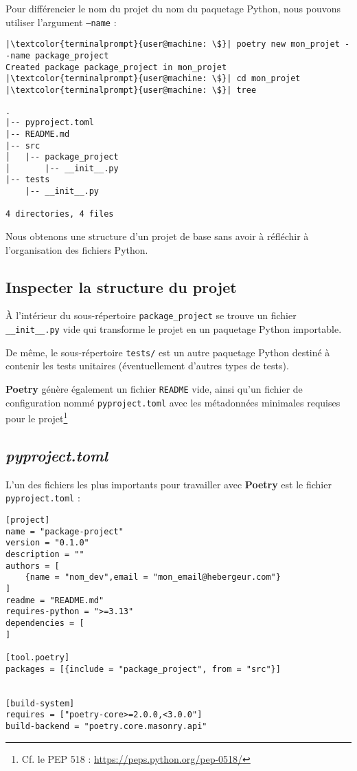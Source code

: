 Pour différencier le nom du projet du nom du paquetage Python, nous pouvons utiliser l'argument \texttt{--name} :
\begin{lstlisting}[style=terminal]
|\textcolor{terminalprompt}{user@machine: \$}| poetry new mon_projet --name package_project
Created package package_project in mon_projet
|\textcolor{terminalprompt}{user@machine: \$}| cd mon_projet
|\textcolor{terminalprompt}{user@machine: \$}| tree
\end{lstlisting}
\begin{verbatim}
.
|-- pyproject.toml
|-- README.md
|-- src
│   |-- package_project
│       |-- __init__.py
|-- tests
    |-- __init__.py

4 directories, 4 files
\end{verbatim}

Nous obtenons une structure d'un projet de base sans avoir à réfléchir à l'organisation des fichiers Python.

\subsection*{Inspecter la structure du projet}
À l'intérieur du sous-répertoire \texttt{package\_project} se trouve un fichier \texttt{\_\_init\_\_.py} vide qui transforme le projet en un paquetage Python importable.

De même, le sous-répertoire \texttt{tests/} est un autre paquetage Python destiné à contenir les tests unitaires (éventuellement d'autres types de tests).


\textbf{Poetry} génère également un fichier \texttt{README} vide, ainsi qu'un fichier de configuration nommé \texttt{pyproject.toml} avec les métadonnées minimales requises pour le projet\footnote{Cf. le PEP 518 : \url{https://peps.python.org/pep-0518/}}

\subsection*{\textit{pyproject.toml}}
L'un des fichiers les plus importants pour travailler avec \textbf{Poetry} est le fichier \texttt{pyproject.toml} :
\begin{verbatim}
[project]
name = "package-project"
version = "0.1.0"
description = ""
authors = [
    {name = "nom_dev",email = "mon_email@hebergeur.com"}
]
readme = "README.md"
requires-python = ">=3.13"
dependencies = [
]

[tool.poetry]
packages = [{include = "package_project", from = "src"}]


[build-system]
requires = ["poetry-core>=2.0.0,<3.0.0"]
build-backend = "poetry.core.masonry.api"
\end{verbatim}

